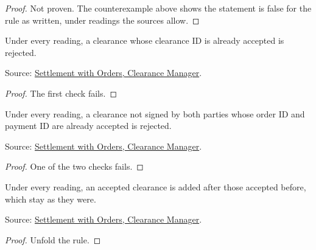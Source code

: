 \begin{proof}
  Not proven.  The counterexample above shows the statement is false for
  the rule as written, under readings the sources allow.
\end{proof}

\begin{theorem}
  \label{thm:accounting-repeated-id}
  Under every reading, a clearance whose clearance ID is already accepted
  is rejected.

  Source: \href{https://standards.atlassian.net/wiki/spaces/SWO/pages/574259794}{Settlement with Orders, Clearance Manager}.
\end{theorem}
\begin{proof}
  The first check fails.
\end{proof}

\begin{theorem}
  \label{thm:accounting-repeated-unsigned}
  Under every reading, a clearance not signed by both parties whose order
  ID and payment ID are already accepted is rejected.

  Source: \href{https://standards.atlassian.net/wiki/spaces/SWO/pages/574259794}{Settlement with Orders, Clearance Manager}.
\end{theorem}
\begin{proof}
  One of the two checks fails.
\end{proof}

\begin{theorem}
  \label{thm:accounting-accepted-recorded}
  Under every reading, an accepted clearance is added after those accepted
  before, which stay as they were.

  Source: \href{https://standards.atlassian.net/wiki/spaces/SWO/pages/574259794}{Settlement with Orders, Clearance Manager}.
\end{theorem}
\begin{proof}
  Unfold the rule.
\end{proof}

